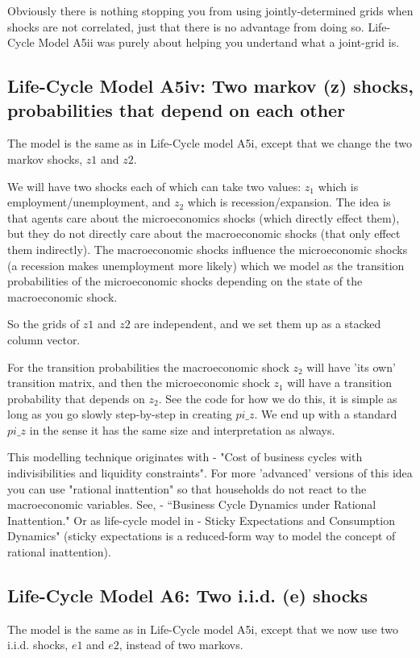 Obviously there is nothing stopping you from using jointly-determined grids when shocks are not correlated, just that there is no advantage from doing so. Life-Cycle Model A5ii was purely about helping you undertand what a joint-grid is.


\subsection{Life-Cycle Model A5iv: Two markov (z) shocks, probabilities that depend on each other}
The model is the same as in Life-Cycle model A5i, except that we change the two markov shocks, $z1$ and $z2$.

We will have two shocks each of which can take two values: $z_1$ which is employment/unemployment, and $z_2$ which is recession/expansion. The idea is that agents care about the microeconomics shocks (which directly effect them), but they do not directly care about the macroeconomic shocks (that only effect them indirectly). The macroeconomic shocks influence the microeconomic shocks (a recession makes unemployment more likely) which we model as the transition probabilities of the microeconomic shocks depending on the state of the macroeconomic shock.

So the grids of $z1$ and $z2$ are independent, and we set them up as a stacked column vector.

For the transition probabilities the macroeconomic shock $z_2$ will have 'its own' transition matrix, and then the microeconomic shock $z_1$ will have a transition probability that depends on $z_2$. See the code for how we do this, it is simple as long as you go slowly step-by-step in creating $pi\_{}z$. We end up with a standard $pi\_{}z$ in the sense it has the same size and interpretation as always.

This modelling technique originates with \cite*{Imrohoroglu1989} - "Cost of business cycles with indivisibilities and liquidity constraints". For more 'advanced' versions of this idea you can use "rational inattention" so that households do not react to the macroeconomic variables. See, \cite*{MackowiakWiederholt2015} - “Business Cycle Dynamics under Rational Inattention." Or as life-cycle model in \cite*{CarrollCrawleySlacalekTokuokaWhite2020} - Sticky Expectations and Consumption Dynamics" (sticky expectations is a reduced-form way to model the concept of rational inattention).

\subsection{Life-Cycle Model A6: Two i.i.d. (e) shocks}
The model is the same as in Life-Cycle model A5i, except that we now use two i.i.d. shocks, $e1$ and $e2$, instead of two markovs.

